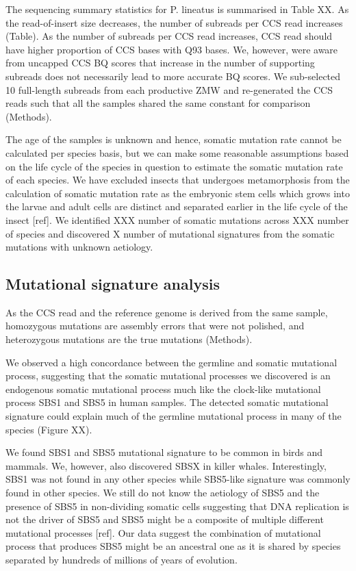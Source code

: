The sequencing summary statistics for P. lineatus is summarised in Table XX. As the read-of-insert size decreases, the number of subreads per CCS read increases (Table). As the number of subreads per CCS read increases, CCS read should have higher proportion of CCS bases with Q93 bases. We, however, were aware from uncapped CCS BQ scores that increase in the number of supporting subreads does not necessarily lead to more accurate BQ scores. We sub-selected 10 full-length subreads from each productive ZMW and re-generated the CCS reads such that all the samples shared the same constant for comparison (Methods). 

The age of the samples is unknown and hence, somatic mutation rate cannot be calculated per species basis, but we can make some reasonable assumptions based on the life cycle of the species in question to estimate the somatic mutation rate of each species. We have excluded insects that undergoes metamorphosis from the calculation of somatic mutation rate as the embryonic stem cells which grows into the larvae and adult cells are distinct and separated earlier in the life cycle of the insect [ref]. We identified XXX number of somatic mutations across XXX number of species and discovered X number of mutational signatures from the somatic mutations with unknown aetiology.

\subsection{Mutational signature analysis}

As the CCS read and the reference genome is derived from the same sample, homozygous mutations are assembly errors that were not polished, and heterozygous mutations are the true mutations (Methods).

We observed a high concordance between the germline and somatic mutational process, suggesting that the somatic mutational processes we discovered is an endogenous somatic mutational process much like the clock-like mutational process SBS1 and SBS5 in human samples. The detected somatic mutational signature could explain much of the germline mutational process in many of the species (Figure XX).

We found SBS1 and SBS5 mutational signature to be common in birds and mammals. We, however, also discovered SBSX in killer whales. Interestingly, SBS1 was not found in any other species while SBS5-like signature was commonly found in other species. We still do not know the aetiology of SBS5 and the presence of SBS5 in non-dividing somatic cells suggesting that DNA replication is not the driver of SBS5 and SBS5 might be a composite of multiple different mutational processes [ref]. Our data suggest the combination of mutational process that produces SBS5 might be an ancestral one as it is shared by species separated by hundreds of millions of years of evolution.

